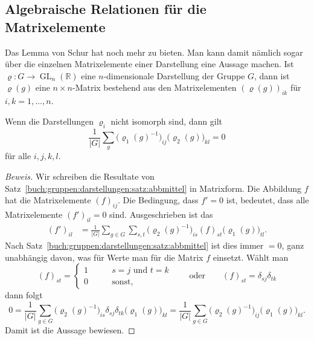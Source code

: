 %
%
%

%
%
\subsection{Algebraische Relationen für die Matrixelemente}
Das Lemma von Schur hat noch mehr zu bieten.
Man kann damit nämlich sogar über die einzelnen Matrixelemente
einer Darstellung eine Aussage machen.
Ist $\varrho\colon G\to \operatorname{GL}_n(\mathbb{R})$ eine 
$n$-dimensionale Darstellung der Gruppe $G$, dann ist $\varrho(g)$
eine $n\times n$-Matrix bestehend aus den Matrixelementen
$(\varrho(g))_{ik}$ für $i,k=1,\dots,n$.

\begin{satz}
\label{buch:gruppen:darstellungen:satz:matrixnichtiso}
Wenn die Darstellungen $\varrho_i$ nicht isomorph sind, dann gilt
\begin{equation}
\frac{1}{|G|}
\sum_{g} \bigl(\varrho_1(g)^{-1}\bigr)_{i\!j} \bigl(\varrho_2(g)\bigr)_{kl}
=
0
\label{buch:gruppen:darstellungen:eqn:matrixnichtiso}
\end{equation}
für alle $i,j,k,l$.
\end{satz}

\begin{proof}[Beweis]
Wir schreiben die Resultate von
Satz~\ref{buch:gruppen:darstellungen:satz:abbmittel}
in Matrixform.
Die Abbildung $f$ hat die Ma\-trix\-e\-le\-men\-te $(f)_{i\!j}$.
Die Bedingung, dass $f'=0$ ist, bedeutet, dass alle
Matrixelemente $(f')_{il}=0$ sind.
Ausgeschrieben ist das
\begin{align*}
(f')_{il}
&=
\frac{1}{|G|}
\sum_{g\in G}
\sum_{s,t}
\bigl(\varrho_2(g)^{-1}\bigr)_{is} (f)_{st} \bigl(\varrho_1(g)\bigr)_{tl}.
\end{align*}
Nach 
Satz~\ref{buch:gruppen:darstellungen:satz:abbmittel}
ist dies immer $=0$, ganz unabhängig davon, was für Werte man für
die Matrix $f$ einsetzt.
Wählt man 
\begin{equation}
(f)_{st}
=
\begin{cases}
1&\qquad\text{$s=j$ und $t=k$}\\
0&\qquad\text{sonst},
\end{cases}
\qquad\text{oder}\qquad
(f)_{st}
=
\delta_{s\!j}\delta_{tk}
\label{buch:gruppen:darstellungen:eqn:fst}
\end{equation}
dann folgt
\[
0
=
\frac{1}{|G|}
\sum_{g\in G} 
\bigl(\varrho_2(g)^{-1}\bigr)_{is}
\delta_{s\!j}
\delta_{tk}
\bigl(\varrho_1(g)\bigr)_{kl}
=
\frac{1}{|G|}
\sum_{g\in G}
\bigl(\varrho_2(g)^{-1}\bigr)_{i\!j}
\bigl(\varrho_1(g)\bigr)_{kl}.
\]
Damit ist die Aussage bewiesen.
\end{proof}

